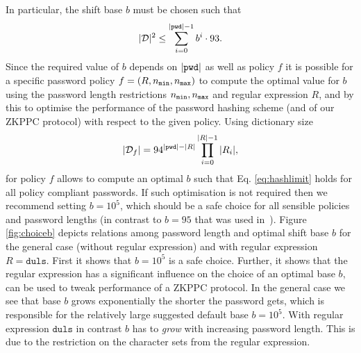 In particular, the shift base $b$ must be chosen such that 
\begin{equation}\label{eq:hashlimit}
  |\mathcal{D}|^2\leq \sum_{i=0}^{|\mathtt{pwd}|-1}b^i\cdot 93.
\end{equation}
Since the required value of $b$ depends on $|\mathtt{pwd}|$ as well as policy $f$ it is possible for a specific password policy $f=(R,{n_\mathtt{min}},{n_\mathtt{max}})$ to compute the optimal value for $b$ using the password length restrictions ${n_\mathtt{min}},{n_\mathtt{max}}$ and regular expression $R$, and by this to optimise the performance of the password hashing scheme (and of our ZKPPC protocol) with respect to the given policy. 
Using dictionary size 
\[|\mathcal{D}_f|=94^{|\mathtt{pwd}|-|R|}\prod_{i=0}^{|R|-1}|R_i|,\]
for policy $f$ allows to compute an optimal $b$ such that Eq. \ref{eq:hashlimit} holds for all policy compliant passwords.
If such optimisation is not required then we recommend setting $b=10^5$, which should be a safe choice for all sensible policies and password lengths (in contrast to $b=95$ that was used in~\cite{KieferM14b}).
Figure \ref{fig:choiceb} depicts relations among password length and optimal shift base $b$ for the general case (without regular expression) and with regular expression $R=\mathtt{duls}$.
First it shows that $b=10^5$ is a safe choice.
Further, it shows that the regular expression has a significant influence on the choice of an optimal base $b$, \ie can be used to tweak performance of a ZKPPC protocol.
In the general case we see that base $b$ grows exponentially the shorter the password gets, which is responsible for the relatively large suggested default base $b=10^5$.
With regular expression $\mathtt{duls}$ in contrast $b$ has to \emph{grow} with increasing password length.
This is due to the restriction on the character sets from the regular expression.


